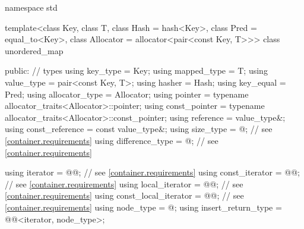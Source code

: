 %
\begin{codeblock}
namespace std {
  template<class Key,
           class T,
           class Hash = hash<Key>,
           class Pred = equal_to<Key>,
           class Allocator = allocator<pair<const Key, T>>>
  class unordered_map {
  public:
    // types
    using key_type             = Key;
    using mapped_type          = T;
    using value_type           = pair<const Key, T>;
    using hasher               = Hash;
    using key_equal            = Pred;
    using allocator_type       = Allocator;
    using pointer              = typename allocator_traits<Allocator>::pointer;
    using const_pointer        = typename allocator_traits<Allocator>::const_pointer;
    using reference            = value_type&;
    using const_reference      = const value_type&;
    using size_type            = @\impdef@; // see \ref{container.requirements}
    using difference_type      = @\impdef@; // see \ref{container.requirements}

    using iterator             = @@; // see \ref{container.requirements}
    using const_iterator       = @@; // see \ref{container.requirements}
    using local_iterator       = @@; // see \ref{container.requirements}
    using const_local_iterator = @@; // see \ref{container.requirements}
    using node_type            = @\unspec@;
    using insert_return_type   = @@<iterator, node_type>;

}}
\end{codeblock}
